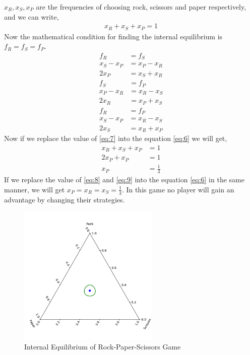 \documentclass{article}
\begin{document}
$x_R,x_S,x_P$ are the frequencies of choosing rock, scissors and paper respectively, and we can write,
\begin{align}
x_R+x_S+x_P=1 \label{eq:7}
\end{align}
Now the mathematical condition for finding the internal equilibrium is $f_R=f_S=f_P$.
\begin{align}
f_R &=f_S \nonumber\\
x_S-x_P &=x_P-x_R \nonumber\\
2x_P &=x_S+x_R \label{eq:8}
\end{align}
\begin{align}
f_S &=f_P \nonumber\\
x_P-x_R &=x_R-x_S \nonumber\\
2x_R &=x_P+x_S \label{eq:9}
\end{align}
\begin{align}
f_R&=f_P \nonumber\\
x_S-x_P&=x_R-x_S \nonumber\\
2x_S&=x_R+x_P \label{eq:10}
\end{align}
Now if we replace the value of \eqref{eq:7} into the equation \eqref{eq:6} we will get,
\begin{align}
x_R+x_S+x_P&=1\nonumber\\
2x_P+x_P&=1\nonumber\\
x_P&=\frac{1}{3}\nonumber
\end{align}
If we replace the value of \eqref{eq:8} and \eqref{eq:9} into the equation \eqref{eq:6} in the same manner, we will get $x_P=x_R=x_S=\frac{1}{3}$. In this game no player will gain an advantage by changing their strategies.
\begin{figure}[H]
    \centering
    \includegraphics[width=0.6\textwidth]{RPS.pdf}
    \caption{Internal Equilibrium of Rock-Paper-Scissors Game}
    \label{fig:4}
\end{figure} 
\end{document}
